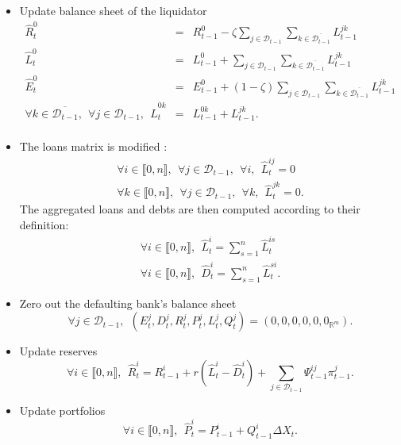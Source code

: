 \documentclass{article}
\newcommand{\wh}{\widehat}
\begin{document}
\begin{itemize}

    \item Update balance sheet of the liquidator  
    \begin{eqnarray*}
    \wh R_t^0 &=& R_{t-1}^0 - \zeta \sum_{j \in \mathcal{D}_{t-1}} \sum_{k \in \overline{\mathcal{D}_{t-1}}} L^{jk}_{t-1}\\
    \wh L_t^0 &=& L_{t-1}^0 + \sum_{j \in \mathcal{D}_{t-1}} \sum_{k \in \overline{\mathcal{D}_{t-1}}} L^{jk}_{t-1}\\
    \wh E_t^0 &=& E_{t-1}^0 + (1 -\zeta) \sum_{j \in \mathcal{D}_{t-1}} \sum_{k \in \overline{\mathcal{D}_{t-1}}} L^{jk}_{t-1}\\
    \forall k \in \overline{\mathcal{D}_{t-1}},~~\forall j \in \mathcal{D}_{t-1},~~ \wh L_t^{0k} &=& L_{t-1}^{0k} + L_{t-1}^{jk}.\\
    \end{eqnarray*}
    
    \item The loans matrix is modified :
    \begin{eqnarray*}
    \forall i \in \llbracket 0, n \rrbracket,~~\forall j \in \mathcal{D}_{t-1},~~\forall i,~~ \wh L_t^{ij} = 0 \\
    \forall k \in \llbracket 0, n \rrbracket,~~\forall j \in \mathcal{D}_{t-1},~~\forall k,~~ \wh L_t^{jk} = 0.
    \end{eqnarray*}
    The aggregated loans and debts are then computed according to their definition:
    \begin{eqnarray*}
    \forall i \in \llbracket 0, n \rrbracket,~~ \wh L_t^i = \sum_{s=1}^n \wh L_t^{is} \\
    \forall i \in \llbracket 0, n \rrbracket,~~ \wh D_t^i = \sum_{s=1}^n \wh L_t^{si}.
    \end{eqnarray*}
    
    \item Zero out the defaulting bank's balance sheet
    $$\forall j \in \mathcal{D}_{t-1},~~(E_t^j, D_t^j, R_t^j, P_t^j, L_t^j, Q_t^j) = (0, 0, 0, 0, 0, 0_{\mathbb{R}^m}).$$
    
    \item Update reserves
    $$ \forall i \in \llbracket 0, n \rrbracket,~~ \widehat{R}_t^i = R_{t-1}^i + r (\wh L_t^i - \wh D_t^i) + \sum_{j \in \mathcal{D}_{t-1}} \Psi_{t-1}^{ij} \pi_{t-1}^j.$$
    
    \item Update portfolios
    $$\forall i \in \llbracket 0, n \rrbracket,~~ \widehat{P}_t^i = P_{t-1}^i + Q_{t-1}^i\Delta X_t.$$
    

\end{itemize}
\end{document}
